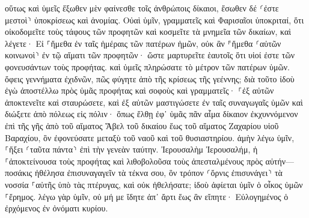 \documentclass[twoside, 9pt]{extreport}
\begin{document}
οὕτως καὶ ὑμεῖς ἔξωθεν μὲν φαίνεσθε τοῖς ἀνθρώποις δίκαιοι, ἔσωθεν δέ ⸂ἐστε μεστοὶ⸃ ὑποκρίσεως καὶ ἀνομίας. 
Οὐαὶ ὑμῖν, γραμματεῖς καὶ Φαρισαῖοι ὑποκριταί, ὅτι οἰκοδομεῖτε τοὺς τάφους τῶν προφητῶν καὶ κοσμεῖτε τὰ μνημεῖα τῶν δικαίων, 
καὶ λέγετε· Εἰ ⸀ἤμεθα ἐν ταῖς ἡμέραις τῶν πατέρων ἡμῶν, οὐκ ἂν ⸁ἤμεθα ⸂αὐτῶν κοινωνοὶ⸃ ἐν τῷ αἵματι τῶν προφητῶν· 
ὥστε μαρτυρεῖτε ἑαυτοῖς ὅτι υἱοί ἐστε τῶν φονευσάντων τοὺς προφήτας. 
καὶ ὑμεῖς πληρώσατε τὸ μέτρον τῶν πατέρων ὑμῶν. 
ὄφεις γεννήματα ἐχιδνῶν, πῶς φύγητε ἀπὸ τῆς κρίσεως τῆς γεέννης; 
διὰ τοῦτο ἰδοὺ ἐγὼ ἀποστέλλω πρὸς ὑμᾶς προφήτας καὶ σοφοὺς καὶ γραμματεῖς· ⸀ἐξ αὐτῶν ἀποκτενεῖτε καὶ σταυρώσετε, καὶ ἐξ αὐτῶν μαστιγώσετε ἐν ταῖς συναγωγαῖς ὑμῶν καὶ διώξετε ἀπὸ πόλεως εἰς πόλιν· 
ὅπως ἔλθῃ ἐφ᾽ ὑμᾶς πᾶν αἷμα δίκαιον ἐκχυννόμενον ἐπὶ τῆς γῆς ἀπὸ τοῦ αἵματος Ἅβελ τοῦ δικαίου ἕως τοῦ αἵματος Ζαχαρίου υἱοῦ Βαραχίου, ὃν ἐφονεύσατε μεταξὺ τοῦ ναοῦ καὶ τοῦ θυσιαστηρίου. 
ἀμὴν λέγω ὑμῖν, ⸀ἥξει ⸂ταῦτα πάντα⸃ ἐπὶ τὴν γενεὰν ταύτην. 
Ἰερουσαλὴμ Ἰερουσαλήμ, ἡ ⸀ἀποκτείνουσα τοὺς προφήτας καὶ λιθοβολοῦσα τοὺς ἀπεσταλμένους πρὸς αὐτήν—ποσάκις ἠθέλησα ἐπισυναγαγεῖν τὰ τέκνα σου, ὃν τρόπον ⸂ὄρνις ἐπισυνάγει⸃ τὰ νοσσία ⸀αὐτῆς ὑπὸ τὰς πτέρυγας, καὶ οὐκ ἠθελήσατε; 
ἰδοὺ ἀφίεται ὑμῖν ὁ οἶκος ὑμῶν ⸀ἔρημος. 
λέγω γὰρ ὑμῖν, οὐ μή με ἴδητε ἀπ᾽ ἄρτι ἕως ἂν εἴπητε· Εὐλογημένος ὁ ἐρχόμενος ἐν ὀνόματι κυρίου. 
\end{document}
